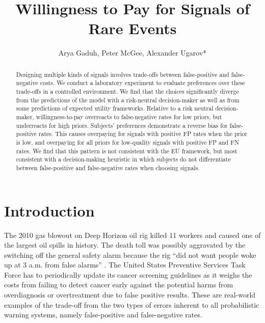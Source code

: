 \documentclass[12pt,a4paper]{article}
\title{\Large Willingness to Pay for Signals of Rare Events\\}
\author{\large Arya Gaduh, Peter McGee, Alexander Ugarov*}
\begin{document}
\maketitle
\onehalfspacing
\begin{abstract}{Designing multiple kinds of signals involves trade-offs between false-positive and false-negative costs. We conduct a laboratory experiment to evaluate preferences over these trade-offs in a controlled environment. We find that the choices significantly diverge from the predictions of the model with a risk-neutral decision-maker as well as from some predictions of expected utility frameworks. Relative to a risk neutral decision-maker, willingness-to-pay overreacts to false-negative rates for low priors, but underreacts for high priors. Subjects' preferences demonstrate a reverse bias for false-positive rates. This causes overpaying for signals with positive FP rates when the prior is low, and overpaying for all priors for low-quality signals with positive FP and FN rates. We find that this pattern is not consistent with the EU framework, but most consistent with a decision-making heuristic in which subjects do not differentiate between false-positive and false-negative rates when choosing signals.}


\vspace{10pt}
\begin{singlespace}

\end{singlespace}
\end{abstract}

\vspace{180pt}
\newpage
\normalsize

\section{Introduction}

The 2010 gas blowout on Deep Horizon oil rig killed 11 workers and caused one of the largest oil spills in history. The death toll was possibly aggravated by the switching off the general safety alarm because the rig ``did not want people woke up at 3 a.m. from false alarms” \citep{brown_oil_2010}. The United States Preventive Services Task Force has to periodically update its cancer screening guidelines as it weighs the costs from failing to detect cancer early against the potential harms from overdiagnosis or overtreatment due to false positive results.
These are real-world examples of the trade-off from the two types of errors inherent to all probabilistic warning systems, namely false-positive and false-negative rates.
\end{document}
